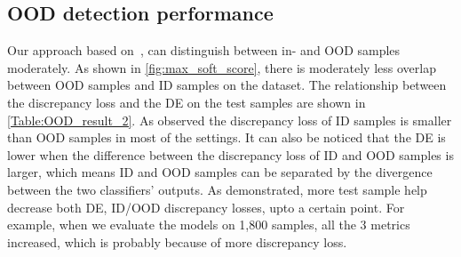 \subsection{OOD detection performance}
Our approach based on~\cite{OOD19}, can distinguish between in- and OOD samples moderately. As shown in \cref{fig:max_soft_score}, there is moderately less overlap between OOD samples and ID samples on the dataset. The relationship between the discrepancy loss and the DE on the test samples are shown in \cref{Table:OOD_result_2}. As observed the discrepancy loss of ID samples is smaller than OOD samples in most of the settings. It can also be noticed that the DE is lower when the difference between the discrepancy loss of ID and OOD samples is larger, which means ID and OOD samples can be separated by the divergence between the two classifiers’ outputs. As demonstrated, more test sample help decrease both DE, ID/OOD discrepancy losses, upto a certain point. For example, when we evaluate the models on 1,800 samples, all the 3 metrics increased, which is probably because of more discrepancy loss. 

